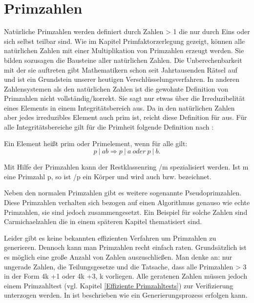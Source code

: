 \section{Primzahlen}\label{Kapitel Primzahlen}
	Natürliche Primzahlen werden definiert durch Zahlen > 1 die nur durch Eins oder sich selbst teilbar sind. Wie im Kapitel Primfaktorzerlegung gezeigt, können alle natürlichen Zahlen mit einer Multiplikation von Primzahlen erzeugt werden. Sie bilden sozusagen die Bausteine aller natürlichen Zahlen. Die Unberechenbarkeit mit der sie auftreten gibt Mathematikern schon seit Jahrtausenden Rätsel auf und ist ein Grundstein unserer heutigen Verschlüsselungsverfahren.
	In anderen Zahlensystemen als den natürlichen Zahlen ist die gewohnte Definition von Primzahlen nicht vollständig/korrekt. Sie sagt nur etwas über die Irreduzibelität eines Elements in einem Integritätsbereich aus. Da in den natürlichen Zahlen aber jedes irreduzibles Element auch prim ist, reicht diese Definition für  aus.
	Für alle Integritätsbereiche gilt für die Primheit folgende Definition nach \cite{Algorithmische:Zahlentheorie}:
	
	Ein Element  heißt prim oder Primelement, wenn für alle  gilt:	
	\begin{displaymath}
		p~|~ab \Longrightarrow p~|~a~oder~p~|~b.
	\end{displaymath}
		
	Mit Hilfe der Primzahlen kann der Restklassenring /m spezialisiert werden. Ist m eine Primzahl p, so ist /p ein Körper und wird auch  bzw.  bezeichnet.
	
	Neben den normalen Primzahlen gibt es weitere sogenannte Pseudoprimzahlen. Diese Primzahlen verhalten sich bezogen auf einen Algorithmus genauso wie echte Primzahlen, sie sind jedoch zusammengesetzt. Ein Beispiel für solche Zahlen sind Carmichaelzahlen die in einem späteren Kapitel thematisiert sind.

	Leider gibt es keine bekannten effizienten Verfahren um Primzahlen zu generieren. Dennoch kann man Primzahlen recht einfach raten. Grundsätzlich ist es möglich eine große Anzahl von Zahlen auszuschließen. Man denke an: nur ungerade Zahlen, die Teilungsgesetze und die Tatsache, dass alle Primzahlen > 3 in der Form 4k +1 oder 4k +3, k \myin {} vorliegen. Alle geratenen Zahlen müssen jedoch einem Primzahltest (vgl. Kapitel \ref{Effiziente Primzahltests}) zur Verifizierung unterzogen werden. In \cite{Algebraische:und:zahlentheoretische:Grundlagen:fuer:die:Informatik} ist beschrieben wie ein Generierungsprozess erfolgen kann.

